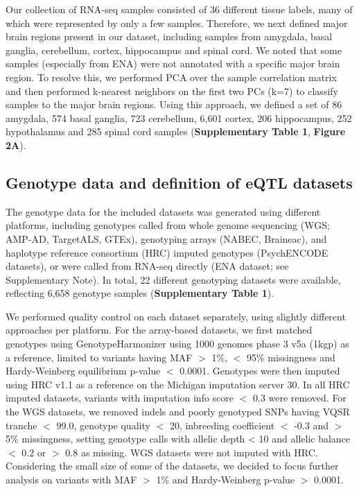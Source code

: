 Our collection of RNA-seq samples consisted of 36 different tissue labels, many of which were represented by only a few samples. Therefore, we next defined major brain regions present in our dataset, including samples from amygdala, basal ganglia, cerebellum, cortex, hippocampus and spinal cord. We noted that some samples (especially from ENA) were not annotated with a specific major brain region. To resolve this, we performed PCA over the sample correlation matrix and then performed k-nearest neighbors on the first two PCs (k=7) to classify samples to the major brain regions. Using this approach, we defined a set of 86 amygdala, 574 basal ganglia, 723 cerebellum, 6,601 cortex, 206 hippocampus, 252 hypothalamus and 285 spinal cord samples (\textbf{Supplementary Table 1}, \textbf{Figure 2A}). 

\subsection{Genotype data and definition of eQTL datasets}
The genotype data for the included datasets was generated using different platforms, including genotypes called from whole genome sequencing (WGS; AMP-AD, TargetALS, GTEx\cite{consortiumGTExConsortiumAtlas2020}), genotyping arrays (NABEC, Braineac\cite{ramasamyGeneticVariabilityRegulation2014}), and haplotype reference consortium (HRC)\cite{mccarthyReferencePanel642016} imputed genotypes (PsychENCODE datasets), or were called from RNA-seq directly (ENA dataset; see Supplementary Note). In total, 22 different genotyping datasets were available, reflecting 6,658 genotype samples (\textbf{Supplementary Table 1}).  

We performed quality control on each dataset separately, using slightly different approaches per platform. For the array-based datasets, we first matched genotypes using GenotypeHarmonizer\cite{deelenGenotypeHarmonizerAutomatic2014} using 1000 genomes phase 3 v5a (1kgp) as a reference, limited to variants having MAF $>$ 1\%, $<$ 95\% missingness and Hardy-Weinberg equilibrium p-value $<$ 0.0001. Genotypes were then imputed using HRC v1.1 as a reference on the Michigan imputation server 30. In all HRC imputed datasets, variants with imputation info score $<$ 0.3 were removed. For the WGS datasets, we removed indels and poorly genotyped SNPs having VQSR tranche $<$ 99.0, genotype quality $<$ 20, inbreeding coefficient $<$ -0.3 and $>$ 5\% missingness, setting genotype calls with allelic depth < 10 and allelic balance $<$ 0.2 or $>$ 0.8 as missing. WGS datasets were not imputed with HRC. Considering the small size of some of the datasets, we decided to focus further analysis on variants with MAF $>$ 1\% and Hardy-Weinberg p-value $>$ 0.0001. 

